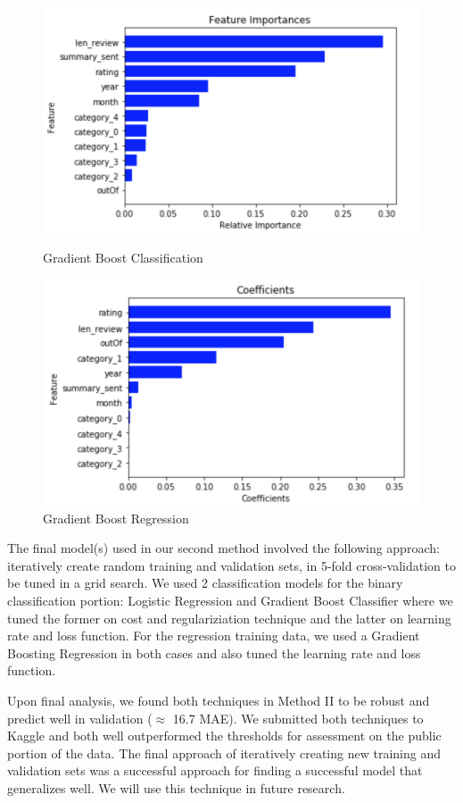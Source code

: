 \documentclass[12pt]{article}
\theoremstyle{plain}
\theoremstyle{definition}
\numberwithin{equation}{theorem}
\begin{document}
\begin{figure}[!htb]
   \begin{minipage}{0.48\textwidth}
     \centering
     \includegraphics[width=1.1\linewidth]{xgb_class}
     \caption{Gradient Boost Classification}\label{Fig: Class Feature Importance}
   \end{minipage}\hfill
   \begin{minipage}{0.48\textwidth}
     \centering
     \includegraphics[width=1.1\linewidth]{xgb_regress}
     \caption{Gradient Boost Regression}\label{Fig: Reg Feature Importance}
   \end{minipage}
\end{figure}
\bigskip

\bigskip
The final model(s) used in our second method involved the following approach: iteratively create random training and validation sets, in 5-fold cross-validation to be tuned in a grid search. We used 2 classification models for the binary classification portion: Logistic Regression and Gradient Boost Classifier where we tuned the former on cost and regulariziation technique and the latter on learning rate and loss function. For the regression training data, we used a Gradient Boosting Regression in both cases and also tuned the learning rate and loss function. 

\bigskip
Upon final analysis, we found both techniques in Method II to be robust and predict well in validation ($\approx$ 16.7 MAE). We submitted both techniques to Kaggle and both well outperformed the thresholds for assessment on the public portion of the data. The final approach of iteratively creating new training and validation sets was a successful approach for finding a successful model that generalizes well. We will use this technique in future research.
\end{document}
